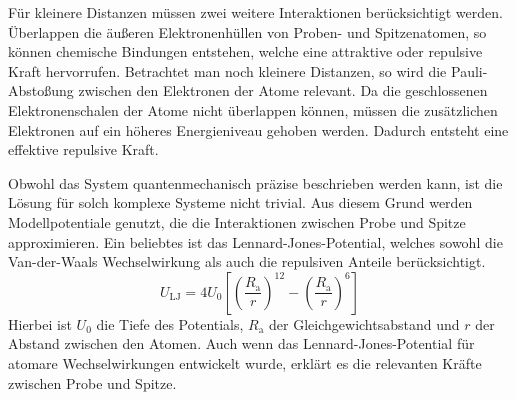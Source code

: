 Für kleinere Distanzen müssen zwei weitere Interaktionen berücksichtigt werden.
Überlappen die äußeren Elektronenhüllen von Proben- und Spitzenatomen, so können chemische Bindungen entstehen, welche
eine attraktive oder repulsive Kraft hervorrufen.
Betrachtet man noch kleinere Distanzen, so wird die Pauli-Abstoßung zwischen den Elektronen der Atome relevant.
Da die geschlossenen Elektronenschalen der Atome nicht überlappen können, müssen die zusätzlichen Elektronen auf ein
höheres Energieniveau gehoben werden.
Dadurch entsteht eine effektive repulsive Kraft.

Obwohl das System quantenmechanisch präzise beschrieben werden kann, ist die Lösung für solch komplexe Systeme
nicht trivial.
Aus diesem Grund werden Modellpotentiale genutzt, die die Interaktionen zwischen Probe und Spitze approximieren.
Ein beliebtes ist das Lennard-Jones-Potential, welches sowohl die Van-der-Waals Wechselwirkung als auch die repulsiven
Anteile berücksichtigt.
\begin{equation*}
    U_{\mathrm{LJ}}=4U_{0}\left[ \left( \frac{R_{\mathrm{a}}}{r} \right)^{12} -\left( \frac{R_{\mathrm{a}}}{r}
    \right)^{6}\right]
\end{equation*}
Hierbei ist $U_{0}$ die Tiefe des Potentials, $R_{\mathrm{a}}$ der Gleichgewichtsabstand und $r$ der Abstand zwischen
den Atomen.
Auch wenn das Lennard-Jones-Potential für atomare Wechselwirkungen entwickelt wurde, erklärt es die relevanten
Kräfte zwischen Probe und Spitze. \autocite[161-164]{afm-buch}

